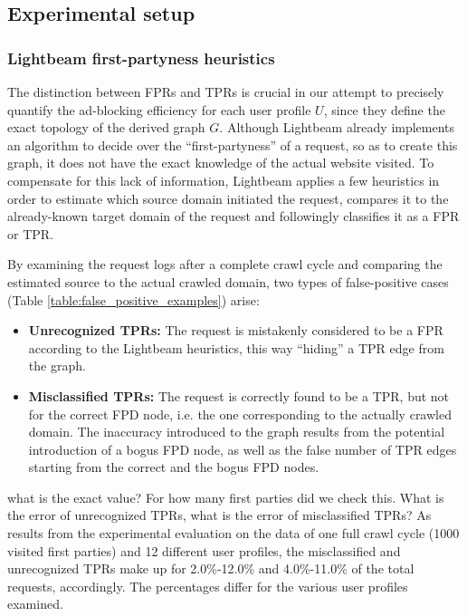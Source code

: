 \documentclass{sig-alternate}
\begin{document}
\subsection{Experimental setup}

\subsubsection{Lightbeam first-partyness heuristics}
The distinction between FPRs and TPRs is crucial in our attempt to precisely quantify the ad-blocking efficiency for each user profile $U$, since they define the exact topology of the derived graph $G$. Although Lightbeam already implements an algorithm to decide over the ``first-partyness'' of a request, so as to create this graph, it does not have the exact knowledge of the actual website visited. To compensate for this lack of information, Lightbeam applies a few heuristics in order to estimate which source domain initiated the request, compares it to the already-known target domain of the request and followingly classifies it as a FPR or TPR.

By examining the request logs after a complete crawl cycle and comparing the estimated source to the actual crawled domain, two types of false-positive cases (Table \ref{table:false_positive_examples}) arise:

\begin{itemize}
\item \textbf{Unrecognized TPRs:} The request is mistakenly considered to be a FPR according to the Lightbeam heuristics, this way ``hiding'' a TPR edge from the graph.
\item \textbf{Misclassified TPRs:} The request is correctly found to be a TPR, but not for the correct FPD node, i.e. the one corresponding to the actually crawled domain. The inaccuracy introduced to the graph results from the potential introduction of a bogus FPD node, as well as the false number of TPR edges starting from the correct and the bogus FPD nodes.
\end{itemize}

{\color{red}what is the exact value? For how many first parties did we check this. What is the error of unrecognized TPRs, what is the error of misclassified TPRs?}
{\color{blue}
As results from the experimental evaluation on the data of one full crawl cycle (1000 visited first parties) and 12 different user profiles, the misclassified and unrecognized TPRs make up for 2.0\%-12.0\% and 4.0\%-11.0\% of the total requests, accordingly. The percentages differ for the various user profiles examined.}
\end{document}
